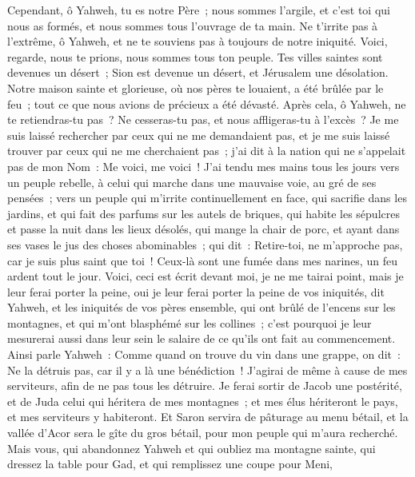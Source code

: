 \begin{multicols}{2}
Cependant, ô Yahweh, tu es notre Père~; nous sommes l'argile, et c'est toi qui nous as formés, et nous sommes tous l'ouvrage de ta main.
Ne t'irrite pas à l'extrême, ô Yahweh, et ne te souviens pas à toujours de notre iniquité. Voici, regarde, nous te prions, nous sommes tous ton peuple.
Tes villes saintes sont devenues un désert~; Sion est devenue un désert, et Jérusalem une désolation.
Notre maison sainte et glorieuse, où nos pères te louaient, a été brûlée par le feu~; tout ce que nous avions de précieux a été dévasté.
Après cela, ô Yahweh, ne te retiendras-tu pas~? Ne cesseras-tu pas, et nous affligeras-tu à l'excès~?
\VerseOne{}Je me suis laissé rechercher par ceux qui ne me demandaient pas, et je me suis laissé trouver par ceux qui ne me cherchaient pas~; j'ai dit à la nation qui ne s'appelait pas de mon Nom~: Me voici, me voici~!
J'ai tendu mes mains tous les jours vers un peuple rebelle, à celui qui marche dans une mauvaise voie, au gré de ses pensées~;
vers un peuple qui m'irrite continuellement en face, qui sacrifie dans les jardins, et qui fait des parfums sur les autels de briques,
qui habite les sépulcres et passe la nuit dans les lieux désolés, qui mange la chair de porc, et ayant dans ses vases le jus des choses abominables~;
qui dit~: Retire-toi, ne m'approche pas, car je suis plus saint que toi~! Ceux-là sont une fumée dans mes narines, un feu ardent tout le jour.
Voici, ceci est écrit devant moi, je ne me tairai point, mais je leur ferai porter la peine, oui je leur ferai porter la peine
de vos iniquités, dit Yahweh, et les iniquités de vos pères ensemble, qui ont brûlé de l'encens sur les montagnes, et qui m'ont blasphémé sur les collines~; c'est pourquoi je leur mesurerai aussi dans leur sein le salaire de ce qu'ils ont fait au commencement.
Ainsi parle Yahweh~: Comme quand on trouve du vin dans une grappe, on dit~: Ne la détruis pas, car il y a là une bénédiction~! J'agirai de même à cause de mes serviteurs, afin de ne pas tous les détruire.
Je ferai sortir de Jacob une postérité, et de Juda celui qui héritera de mes montagnes~; et mes élus hériteront le pays, et mes serviteurs y habiteront.
Et Saron servira de pâturage au menu bétail, et la vallée d'Acor sera le gîte du gros bétail, pour mon peuple qui m'aura recherché.
Mais vous, qui abandonnez Yahweh et qui oubliez ma montagne sainte, qui dressez la table pour Gad, et qui remplissez une coupe pour Meni,

\end{multicols}
